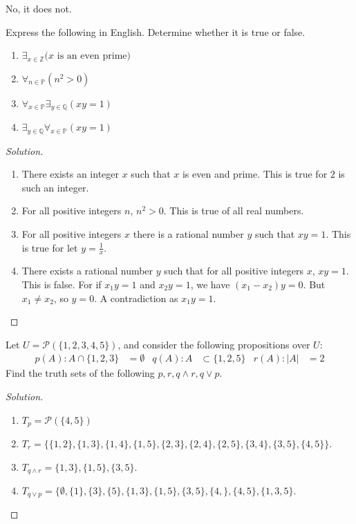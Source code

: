     \begin{solution}
        No, it does not.
    \end{solution}
    \begin{problem}
    Express the following in English. Determine whether it is true or false.
    \begin{enumerate}
        \item $\exists_{x\in \mathbb{Z}}\textrm{($x$ is an even prime)}$
        \item $\forall_{n\in \mathbb{P}}(n^2>0)$
        \item $\forall_{x\in \mathbb{P}}\exists_{y\in \mathbb{Q}}(xy=1)$
        \item $\exists_{y\in \mathbb{Q}}\forall_{x\in \mathbb{P}}(xy=1)$
    \end{enumerate}
    \end{problem}
    \begin{proof}[Solution]
    \par
        \begin{enumerate}
            \item   There exists an integer $x$ such that $x$ is even and
                    prime. This is true for $2$ is such an integer.
            \item   For all positive integers $n$, $n^2>0$. This is true of all
                    real numbers.
            \item   For all positive integers $x$ there is a rational number $y$
                    such that $xy=1$. This is true for let $y=\frac{1}{x}$.
            \item   There exists a rational number $y$ such that for all
                    positive integers $x$, $xy=1$. This is false. For if
                    $x_{1}y=1$ and $x_{2}y=1$, we have $(x_{1}-x_{2})y=0$. But
                    $x_{1}\ne{x}_{2}$, so $y=0$. A contradiction as $x_{1}y=1$.
        \end{enumerate}
    \end{proof}
    \begin{problem}
    Let $U = \mathcal{P}(\{1,2,3,4,5\})$, and consider the following propositions over $U$:
    \begin{align*}
        p(A):A\cap\{1,2,3\} &=\emptyset & q(A):A&\subset\{1,2,5\} & r(A):|A| &=2
    \end{align*}
    Find the truth sets of the following $p,r, q\land r, q\lor p$.
    \end{problem}
    \begin{proof}[Solution]
    \vspace{-\topsep}
    \
    \begin{enumerate}
        \item $T_{p} = \mathcal{P}(\{4,5\})$
        \item $T_{r} = \{\{1,2\},\{1,3\},\{1,4\},\{1,5\},\{2,3\},\{2,4\},\{2,5\},\{3,4\},\{3,5\},\{4,5\}\}$.
        \item $T_{q\land r} = \{1,3\},\{1,5\},\{3,5\}$.
        \item $T_{q\lor p} = \{\emptyset, \{1\},\{3\},\{5\},\{1,3\},\{1,5\},\{3,5\},\{4,\},\{4,5\},\{1,3,5\}$.
    \end{enumerate}
    \end{proof}
